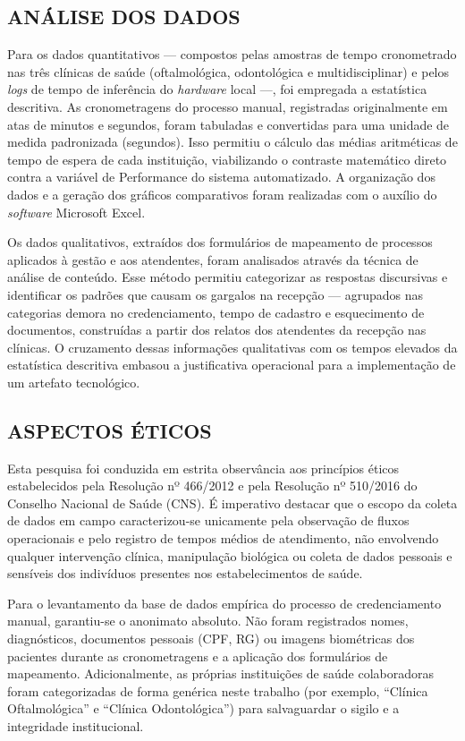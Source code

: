 \subsection{ANÁLISE DOS DADOS}
\label{subsec:analise-dados}

Para os dados quantitativos — compostos pelas amostras de tempo cronometrado nas três clínicas de saúde (oftalmológica, odontológica e multidisciplinar) e pelos \textit{logs} de tempo de inferência do \textit{hardware} local —, foi empregada a estatística descritiva. As cronometragens do processo manual, registradas originalmente em atas de minutos e segundos, foram tabuladas e convertidas para uma unidade de medida padronizada (segundos). Isso permitiu o cálculo das médias aritméticas de tempo de espera de cada instituição, viabilizando o contraste matemático direto contra a variável de Performance do sistema automatizado. A organização dos dados e a geração dos gráficos comparativos foram realizadas com o auxílio do \textit{software} Microsoft Excel.  

Os dados qualitativos, extraídos dos formulários de mapeamento de processos aplicados à gestão e aos atendentes, foram analisados através da técnica de análise de conteúdo. Esse método permitiu categorizar as respostas discursivas e identificar os padrões que causam os gargalos na recepção — agrupados nas categorias demora no credenciamento, tempo de cadastro e esquecimento de documentos, construídas a partir dos relatos dos atendentes da recepção nas clínicas. O cruzamento dessas informações qualitativas com os tempos elevados da estatística descritiva embasou a justificativa operacional para a implementação de um artefato tecnológico. 

\subsection{ASPECTOS ÉTICOS}
\label{subsec:aspectos-eticos}

Esta pesquisa foi conduzida em estrita observância aos princípios éticos estabelecidos pela Resolução nº 466/2012 e pela Resolução nº 510/2016 do Conselho Nacional de Saúde (CNS). É imperativo destacar que o escopo da coleta de dados em campo caracterizou-se unicamente pela observação de fluxos operacionais e pelo registro de tempos médios de atendimento, não envolvendo qualquer intervenção clínica, manipulação biológica ou coleta de dados pessoais e sensíveis dos indivíduos presentes nos estabelecimentos de saúde.  

Para o levantamento da base de dados empírica do processo de credenciamento manual, garantiu-se o anonimato absoluto. Não foram registrados nomes, diagnósticos, documentos pessoais (CPF, RG) ou imagens biométricas dos pacientes durante as cronometragens e a aplicação dos formulários de mapeamento. Adicionalmente, as próprias instituições de saúde colaboradoras foram categorizadas de forma genérica neste trabalho (por exemplo, ``Clínica Oftalmológica'' e ``Clínica Odontológica'') para salvaguardar o sigilo e a integridade institucional.  

